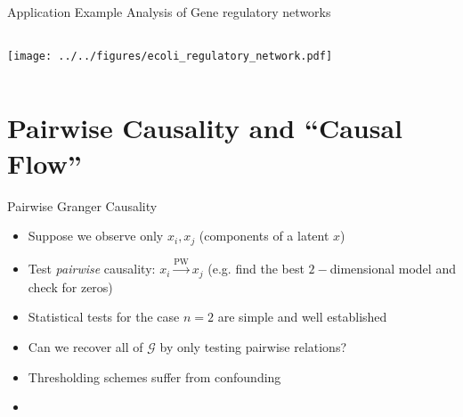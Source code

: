 \documentclass{beamer} %
\def\pwgc{\overset{\text{PW}}{\rightarrow}}  %
\def\gcg{\mathcal{G}}  %
\begin{document}

  


\begin{frame}{Application Example}
  Analysis of Gene regulatory networks
  
  \begin{columns}
    \begin{column}{0.5\linewidth}
      \texttt{[image: ../../figures/ecoli\_regulatory\_network.pdf]}
    \end{column}
  \end{columns}

\end{frame}

\section{Pairwise Causality and ``Causal Flow''}
\begin{frame}{Pairwise Granger Causality}
  \begin{itemize}
    \item{Suppose we observe only $x_i, x_j$ (components of a latent $x$)}\pause
    \item{Test \textit{pairwise} causality: $x_i \pwgc x_j$ (e.g. find
        the best $2-$dimensional model and check for zeros)}\pause
    \item{Statistical tests for the case $n = 2$ are simple and well established}\pause
    \item{Can we recover all of $\gcg$ by only testing pairwise relations?}\pause
    \item{Thresholding schemes suffer from confounding}\pause
    \item{}
  \end{itemize}
\end{frame}
\end{document}
